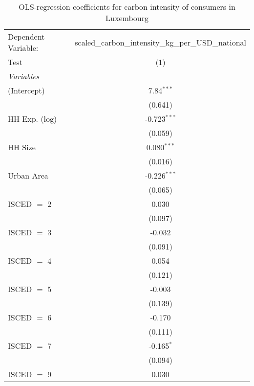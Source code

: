 
\begin{table}[htbp!]
   \centering
   \small
   \begin{adjustbox}{width = 1\textwidth, max height = 0.95\textheight, center}
      \begin{threeparttable}[b]
         \caption{\label{tab:OLS_1_LUX} OLS-regression coefficients for carbon intensity of consumers in Luxembourg}
         \begin{tabular}{lc}
            \tabularnewline \midrule \midrule
            Dependent Variable: & scaled\_carbon\_intensity\_kg\_per\_USD\_national\\        
            Test                & (1)\\  
            \midrule
            \emph{Variables}\\
            (Intercept)         & 7.84$^{***}$\\   
                                & (0.641)\\   
            HH Exp. (log)       & -0.723$^{***}$\\   
                                & (0.059)\\   
            HH Size             & 0.080$^{***}$\\   
                                & (0.016)\\   
            Urban Area          & -0.226$^{***}$\\   
                                & (0.065)\\   
            ISCED $=$ 2         & 0.030\\   
                                & (0.097)\\   
            ISCED $=$ 3         & -0.032\\   
                                & (0.091)\\   
            ISCED $=$ 4         & 0.054\\   
                                & (0.121)\\   
            ISCED $=$ 5         & -0.003\\   
                                & (0.139)\\   
            ISCED $=$ 6         & -0.170\\   
                                & (0.111)\\   
            ISCED $=$ 7         & -0.165$^{*}$\\   
                                & (0.094)\\   
            ISCED $=$ 9         & 0.030\\   

\end{tabular}
\end{threeparttable}
\end{adjustbox}
\end{table}
